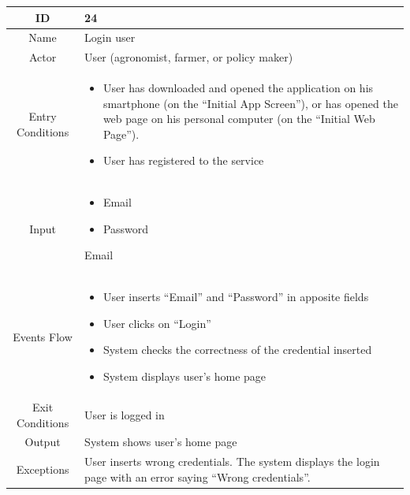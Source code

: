 \documentclass{article}
\begin{document}
\begin{center}
    
    
    \begin{longtable}{|c| p{10cm}|}
        \hline
            ID & 24 \\
        \hline
            Name & Login user \\
        \hline
            Actor & User (agronomist, farmer, or policy maker) \\
        \hline
            Entry Conditions &  \begin{itemize}
                                    \item User has downloaded and opened the application on his smartphone (on the “Initial App Screen”), or has opened the web page on his personal computer (on the “Initial Web Page”).
                                    \item User has registered to the service
                                \end{itemize}\\
        \hline
            Input &     \begin{itemize}
                            \item Email
                            \item Password
                        \end{itemize}Email \\
        \hline
            Events Flow &   \begin{itemize}
                                \item User inserts “Email” and “Password” in apposite fields
                                \item User clicks on “Login”
                                \item System checks the correctness of the credential inserted
                                \item System displays user’s home page
                            \end{itemize} \\
        \hline
            Exit Conditions & User is logged in \\
        \hline
            Output & System shows user’s home page\\
        \hline
            Exceptions & User inserts wrong credentials. The system displays the login page with an error saying “Wrong credentials”.\\
        \hline
    \end{longtable}
    

\end{center}
\end{document}
